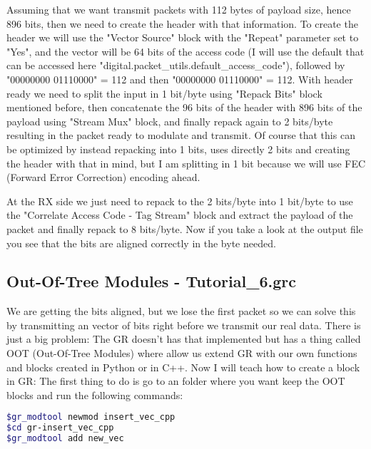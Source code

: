 \documentclass[a4paper, 10pt, conference]{ieeeconf}      %
\begin{document}
    Assuming that we want transmit packets with 112 bytes of payload size, hence 896 bits, then we need to create the header with that information. 
    To create the header we will use the "Vector Source" block with the "Repeat" parameter set to "Yes", and the vector will be 64 bits of the access code (I will use the default that can be accessed here "digital.packet\_utils.default\_access\_code"), followed by "00000000 01110000" = 112 and then "00000000 01110000" = 112. With header ready we need to split the input in 1 bit/byte using "Repack Bits" block mentioned before, then concatenate the 96 bits of the header with 896 bits of the payload using "Stream Mux" block, and finally repack again to 2 bits/byte resulting in the packet ready to modulate and transmit. Of course that this can be optimized by instead repacking into 1 bits, uses directly 2 bits and creating the header with that in mind, but I am splitting in 1 bit because we will use FEC (Forward Error Correction) encoding ahead.
    
    At the RX side we just need to repack to the 2 bits/byte into 1 bit/byte to use the "Correlate Access Code - Tag Stream" block and extract the payload of the packet and finally repack to 8 bits/byte. Now if you take a look at the output file you see that the bits are aligned correctly in the byte needed.
    
\subsection{Out-Of-Tree Modules - Tutorial\_6.grc}
    We are getting the bits aligned, but we lose the first packet so we can solve this by transmitting an vector of bits right before we transmit our real data. There is just a big problem: The GR doesn't has that implemented but has a thing called OOT (Out-Of-Tree Modules) where allow us extend GR with our own functions and blocks created in Python or in C++. Now I will teach how to create a block in GR: The first thing to do is go to an folder where you want keep the OOT blocks and run the following commands: 

\begin{lstlisting}[language=bash, breaklines]
$gr_modtool newmod insert_vec_cpp
$cd gr-insert_vec_cpp
$gr_modtool add new_vec
\end{lstlisting}
\end{document}

